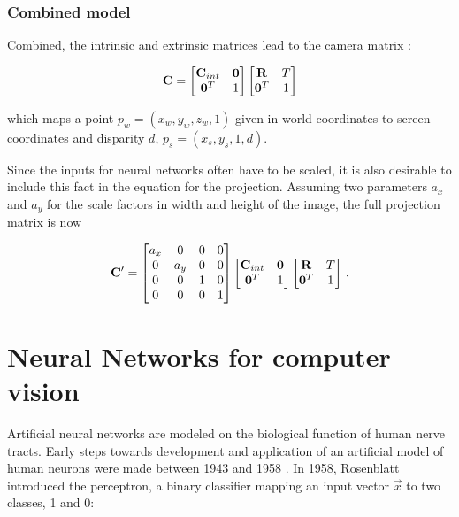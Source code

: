 		\subsubsection{Combined model}
			Combined, the intrinsic and extrinsic matrices lead to the camera matrix \cite{Szeliski2010}:
			
			\begin{equation}
			\mathbf{C} = \begin{bmatrix}\mathbf{C}_{int} & \mathbf{0}\\\mathbf{0}^T & 1\end{bmatrix}
			\begin{bmatrix}\mathbf{R} & T\\\mathbf{0}^T & 1\end{bmatrix}
			\end{equation}
			
			which maps a point $p_w = \left(x_w, y_w, z_w, 1\right)$ given in world coordinates to screen coordinates and disparity $d$, $p_s = \left(x_s, y_s, 1, d\right)$.
			
			Since the inputs for neural networks often have to be scaled, it is also desirable to include this fact in the equation for the projection. Assuming two parameters $a_x$ and $a_y$ for the scale factors in width and height of the image, the full projection matrix is now
			
			\begin{equation}
			\mathbf{C}' = \begin{bmatrix}a_x & 0 & 0 & 0\\ 0 & a_y & 0 & 0\\0 & 0 & 1 & 0\\0 & 0 & 0 & 1\end{bmatrix} \begin{bmatrix}\mathbf{C}_{int} & \mathbf{0}\\\mathbf{0}^T & 1\end{bmatrix}
			\begin{bmatrix}\mathbf{R} & T\\\mathbf{0}^T & 1\end{bmatrix} \,.
			\end{equation}
		
\section { Neural Networks for computer vision }
	Artificial neural networks 	are modeled on the biological function of human nerve tracts. Early steps towards development and application of an artificial model of human neurons were made between 1943 and 1958 \cite{McCulloch1943, ROSENBLATT1958}. In 1958, Rosenblatt introduced the perceptron, a binary classifier mapping an input vector $\vec{x}$ to two classes, 1 and 0:
	
